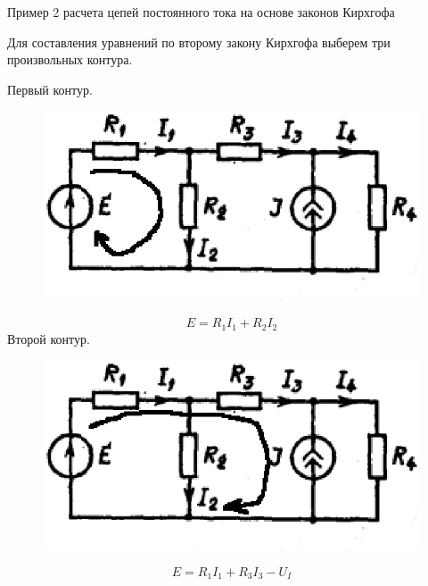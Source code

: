 \documentclass[10pt, pdf, hyperref={unicode},handout]{beamer}
\begin{document}
\begin{frame}{Пример 2  расчета цепей постоянного тока на основе законов Кирхгофа}
  \begin{block}

    \small{
      Для составления уравнений по второму закону Кирхгофа выберем три произвольных контура.

      Первый контур.
       \begin{figure}[htb] 
    \centering
    \includegraphics [scale=0.9]{ris11.eps}
  \end{figure}
  $$E=R_1I_1+R_2I_2$$
  Второй контур.
    \begin{figure}[htb] 
    \centering
    \includegraphics [scale=0.9]{ris12.eps}
  \end{figure}
  $$E=R_1I_1+R_3I_3-U_{I}$$
  
}
  \end{block}
  
\end{frame}
\end{document}
